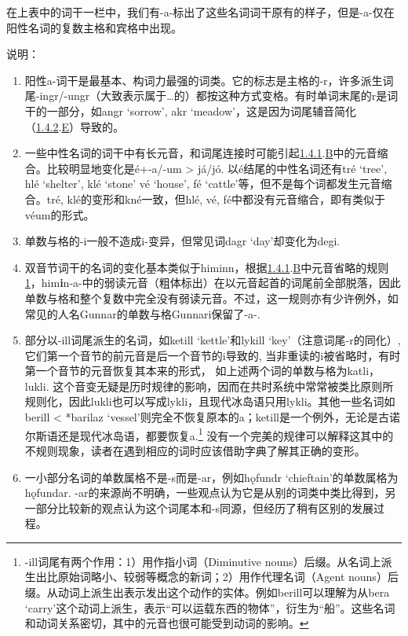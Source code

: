 在上表中的词干一栏中，我们有-a-标出了这些名词词干原有的样子，但是-a-仅在阳性名词的复数主格和宾格中出现。

说明：

\begin{enumerate}
  \def\labelenumi{\arabic{enumi})}
  \item
        阳性a-词干是最基本、构词力最强的词类。它的标志是主格的-r，许多派生词尾-ingr/-ungr（大致表示属于\ldots 的）都按这种方式变格。有时单词末尾的r是词干的一部分，如angr
        `sorrow', akr
        `meadow'，这是因为词尾辅音简化（\hyperref[ux8f85ux97f3ux7684ux97f3ux53d8]{1.4.2}.\hyperref[_Ref115765758]{E}）导致的。
  \item
        一些中性名词的词干中有长元音，和词尾连接时可能引起\hyperref[ux5143ux97f3ux7684ux97f3ux53d8]{1.4.1}.\hyperref[_Ref115693879]{B}中的元音缩合。比较明显地变化是é+-a/-um
        \textgreater{} já/jó. 以é结尾的中性名词还有tré `tree', hlé `shelter',
        klé `stone' vé `house', fé
        `cattle'等，但不是每个词都发生元音缩合。tré,
        klé的变形和kné一致，但hlé, vé,
        fé中都没有元音缩合，即有类似于véum的形式。
  \item
        单数与格的-i一般不造成i-变异，但常见词dagr `day'却变化为degi.
  \item
        双音节词干的名词的变化基本类似于himinn，根据\hyperref[ux5143ux97f3ux7684ux97f3ux53d8]{1.4.1}.\hyperref[_Ref115693879]{B}中元音省略的规则\hyperref[_Ref115694569]{1}，him\textbf{i}n-a-中的弱读元音（粗体标出）在以元音起首的词尾前全部脱落，因此单数与格和整个复数中完全没有弱读元音。不过，这一规则亦有少许例外，如常见的人名Gunnar的单数与格Gunnari保留了-a-.
  \item
        部分以-ill词尾派生的名词，如ketill `kettle'和lykill
        `key'（注意词尾-r的同化）,
        它们第一个音节的前元音是后一个音节的i导致的,
        当非重读的i被省略时，有时第一个音节的元音恢复其本来的形式，
        如上述两个词的单数与格为katli，lukli.
        这个音变无疑是历时规律的影响，因而在共时系统中常常被类比原则所规则化，因此lukli也可以写成lykli，且现代冰岛语只用lykli。其他一些名词如berill
        \textless{} *barilaz
        `vessel'则完全不恢复原本的a；ketill是一个例外，无论是古诺尔斯语还是现代冰岛语，都要恢复a.\footnote{-ill词尾有两个作用：1）用作指小词（Diminutive
          nouns）后缀。从名词上派生出比原始词略小、较弱等概念的新词；2）用作代理名词（Agent
          nouns）后缀。从动词上派生出表示发出这个动作的实体。例如berill可以理解为从bera
          `carry'这个动词上派生，表示``可以运载东西的物体''，衍生为``船''。这些名词和动词关系密切，其中的元音也很可能受到动词的影响。}
        没有一个完美的规律可以解释这其中的不规则现象，读者在遇到相应的词时应该借助字典了解其正确的变形。
  \item
        一小部分名词的单数属格不是-s而是-ar，例如hǫfundr
        `chieftain'的单数属格为hǫfundar.
        -ar的来源尚不明确，一些观点认为它是从别的词类中类比得到，另一部分比较新的观点认为这个词尾本和-s同源，但经历了稍有区别的发展过程。
\end{enumerate}

